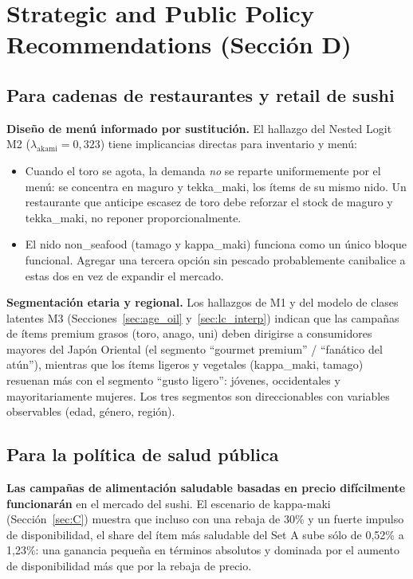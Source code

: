 \documentclass[12pt,a4paper]{article}
\begin{document}
\section{Strategic and Public Policy Recommendations (Sección D)}
\label{sec:D}

\subsection{Para cadenas de restaurantes y retail de sushi}

\textbf{Diseño de menú informado por sustitución.} El hallazgo del Nested Logit M2 ($\lambda_{\text{akami}} = 0{,}323$) tiene implicancias directas para inventario y menú:
\begin{itemize}[nosep]
  \item Cuando el toro se agota, la demanda \emph{no} se reparte uniformemente por el menú: se concentra en maguro y tekka\_maki, los ítems de su mismo nido. Un restaurante que anticipe escasez de toro debe reforzar el stock de maguro y tekka\_maki, no reponer proporcionalmente.
  \item El nido non\_seafood (tamago y kappa\_maki) funciona como un único bloque funcional. Agregar una tercera opción sin pescado probablemente canibalice a estas dos en vez de expandir el mercado.
\end{itemize}

\textbf{Segmentación etaria y regional.} Los hallazgos de M1 y del modelo de clases latentes M3 (Secciones~\ref{sec:age_oil} y~\ref{sec:lc_interp}) indican que las campañas de ítems premium grasos (toro, anago, uni) deben dirigirse a consumidores mayores del Japón Oriental (el segmento ``gourmet premium'' / ``fanático del atún''), mientras que los ítems ligeros y vegetales (kappa\_maki, tamago) resuenan más con el segmento ``gusto ligero'': jóvenes, occidentales y mayoritariamente mujeres. Los tres segmentos son direccionables con variables observables (edad, género, región).

\subsection{Para la política de salud pública}

\textbf{Las campañas de alimentación saludable basadas en precio difícilmente funcionarán} en el mercado del sushi. El escenario de kappa-maki (Sección~\ref{sec:C}) muestra que incluso con una rebaja de 30\% y un fuerte impulso de disponibilidad, el share del ítem más saludable del Set A sube sólo de 0,52\% a 1,23\%: una ganancia pequeña en términos absolutos y dominada por el aumento de disponibilidad más que por la rebaja de precio.
\end{document}
